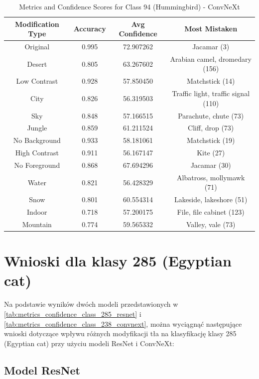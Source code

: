 \begin{table}
	\centering
	\begin{tabular}{|c|c|c|c|}
		\hline
		\textbf{Modification Type} & \textbf{Accuracy} & \textbf{Avg Confidence} & \textbf{Most Mistaken} \\
		\hline
		Original & 0.995 & 72.907262 & Jacamar (3) \\
		\hline
		Desert & 0.805 & 63.267602 & Arabian camel, dromedary (156) \\
		\hline
		Low Contrast & 0.928 & 57.850450 & Matchstick (14) \\
		\hline
		City & 0.826 & 56.319503 & Traffic light, traffic signal (110) \\
		\hline
		Sky & 0.848 & 57.166515 & Parachute, chute (73) \\
		\hline
		Jungle & 0.859 & 61.211524 & Cliff, drop (73) \\
		\hline
		No Background & 0.933 & 58.181061 & Matchstick (19) \\
		\hline
		High Contrast & 0.911 & 56.167147 & Kite (27) \\
		\hline
		No Foreground & 0.868 & 67.694296 & Jacamar (30) \\
		\hline
		Water & 0.821 & 56.428329 & Albatross, mollymawk (71) \\
		\hline
		Snow & 0.801 & 60.554314 & Lakeside, lakeshore (51) \\
		\hline
		Indoor & 0.718 & 57.200175 & File, file cabinet (123) \\
		\hline
		Mountain & 0.774 & 59.565332 & Valley, vale (73) \\
		\hline
	\end{tabular}
	\caption{Metrics and Confidence Scores for Class 94 (Hummingbird) - ConvNeXt}
	\label{tab:metrics_confidence_class_94_convnext}
\end{table}

\section*{Wnioski dla klasy 285 (Egyptian cat)}

Na podstawie wyników dwóch modeli przedstawionych w \ref*{tab:metrics_confidence_class_285_resnet} i \ref*{tab:metrics_confidence_class_238_convnext}, można wyciągnąć następujące wnioski dotyczące wpływu różnych 
modyfikacji tła na klasyfikację klasy 285 (Egyptian cat) przy użyciu modeli ResNet i ConvNeXt:

\subsection*{Model ResNet}

